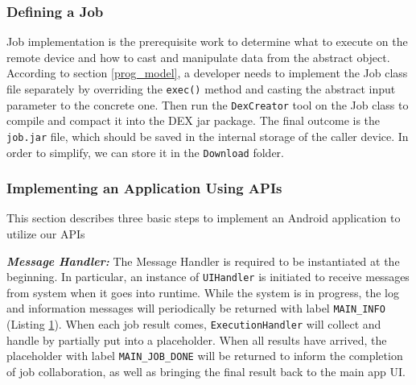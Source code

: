 \documentclass{sig-alternate}[10pt]
\begin{document}
\subsubsection{Defining a Job}
Job implementation is the prerequisite work to determine what to execute on the remote device and how to cast and manipulate data from the abstract object. According to section \ref{prog_model}, a developer needs to implement the Job class file separately by overriding the \texttt{exec()} method and casting the abstract input parameter to the concrete one. Then run the \texttt{DexCreator} tool on the Job class to compile and compact it into the DEX jar package. The final outcome is the \texttt{job.jar} file, which should be saved in the internal storage of the caller device. In order to simplify, we can store it in the \texttt{Download} folder.  

\subsubsection{Implementing an Application Using APIs}
This section describes three basic steps to implement an Android application to utilize our APIs

\textbf{\emph{Message Handler:}}
The Message Handler is required to be instantiated at the beginning. In particular, an instance of \texttt{UIHandler} is initiated to receive messages from system when it goes into runtime. While the system is in progress, the log and information messages will periodically be returned with label \texttt{MAIN\_INFO} (Listing \ref{ui_handler}). When each job result comes, \texttt{ExecutionHandler} will collect and handle by partially put into a placeholder. When all results have arrived, the placeholder with label \texttt{MAIN\_JOB\_DONE} will be returned to inform the completion of job collaboration, as well as bringing the final result back to the main app UI.

\begin{figure}
\noindent {}
\label{ui_handler}
\end{figure}
\end{document}
